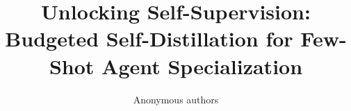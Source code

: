 \documentclass{article} %
\title{Unlocking Self-Supervision: \\
Budgeted Self-Distillation for Few-Shot Agent Specialization}
\author{Anonymous authors\\
\And
\\
}
\begin{document}
\maketitle

\begin{abstract}

\end{abstract}












\appendix

\end{document}
